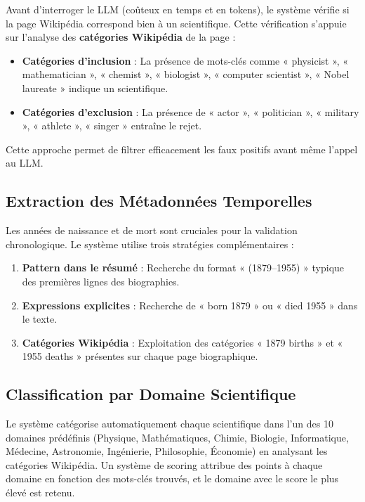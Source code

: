 \documentclass[12pt,a4paper]{report}
\begin{document}
Avant d'interroger le LLM (coûteux en temps et en tokens), le système vérifie si la page Wikipédia correspond bien à un scientifique. Cette vérification s'appuie sur l'analyse des \textbf{catégories Wikipédia} de la page :

\begin{itemize}
    \item \textbf{Catégories d'inclusion} : La présence de mots-clés comme « physicist », « mathematician », « chemist », « biologist », « computer scientist », « Nobel laureate » indique un scientifique.
    \item \textbf{Catégories d'exclusion} : La présence de « actor », « politician », « military », « athlete », « singer » entraîne le rejet.
\end{itemize}

Cette approche permet de filtrer efficacement les faux positifs avant même l'appel au LLM.

\subsection{Extraction des Métadonnées Temporelles}

Les années de naissance et de mort sont cruciales pour la validation chronologique. Le système utilise trois stratégies complémentaires :

\begin{enumerate}
    \item \textbf{Pattern dans le résumé} : Recherche du format « (1879–1955) » typique des premières lignes des biographies.
    \item \textbf{Expressions explicites} : Recherche de « born 1879 » ou « died 1955 » dans le texte.
    \item \textbf{Catégories Wikipédia} : Exploitation des catégories « 1879 births » et « 1955 deaths » présentes sur chaque page biographique.
\end{enumerate}

\subsection{Classification par Domaine Scientifique}

Le système catégorise automatiquement chaque scientifique dans l'un des 10 domaines prédéfinis (Physique, Mathématiques, Chimie, Biologie, Informatique, Médecine, Astronomie, Ingénierie, Philosophie, Économie) en analysant les catégories Wikipédia. Un système de scoring attribue des points à chaque domaine en fonction des mots-clés trouvés, et le domaine avec le score le plus élevé est retenu.
\end{document}
